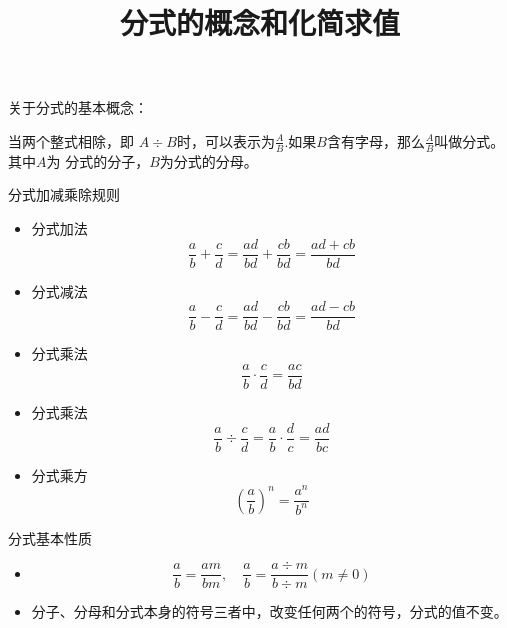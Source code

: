 \documentclass[windows,csize4,answers]{BHCexam}
\title{分式的概念和化简求值}
\begin{document}
\maketitle

\begin{groups}


    关于分式的基本概念：\\
    \fbox
    {
        \parbox{\textwidth}
        {
            当两个整式相除，即 $A\div B$时，可以表示为$\frac{A}{B}$.如果$B$含有字母，那么$\frac{A}{B}$叫做分式。其中$A$为
            分式的分子，$B$为分式的分母。
        }
    }

    分式加减乘除规则
    \begin{itemize}
        \item 分式加法 \\
              \[
                  \frac{a}{b}+\frac{c}{d}=\frac{ad}{bd}+\frac{cb}{bd}=\frac{ad+cb}{bd}
              \]

        \item 分式减法 \\
              \[
                  \frac{a}{b}-\frac{c}{d}=\frac{ad}{bd}-\frac{cb}{bd}=\frac{ad-cb}{bd}
              \]
        \item 分式乘法 \\
              \[
                  \frac{a}{b}\cdot\frac{c}{d}=\frac{ac}{bd}
              \]
        \item 分式乘法 \\
              \[
                  \frac{a}{b}\div\frac{c}{d}=\frac{a}{b}\cdot\frac{d}{c}=\frac{ad}{bc}
              \]
        \item 分式乘方 \\
              \[
                  \left(\frac{a}{b}\right)^n=\frac{a^n}{b^n}
              \]
    \end{itemize}

    分式基本性质
    \begin{itemize}
        \item
              \[
                  \frac{a}{b}=\frac{am}{bm}, \quad
                  \frac{a}{b}=\frac{a\div m}{b\div m} (m\neq 0)
              \]
        \item 分子、分母和分式本身的符号三者中，改变任何两个的符号，分式的值不变。
    \end{itemize}


\end{groups}
\end{document}
